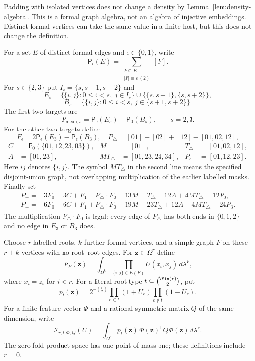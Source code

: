 Padding with isolated vertices does not change a density by Lemma~\ref{lem:density-algebra}.
This is a formal graph algebra, not an algebra of injective embeddings.  Distinct formal
vertices can take the same value in a finite host, but this does not change the definition.

\begin{definition}
\label{def:certificate-targets}
For a set $E$ of distinct formal edges and $\epsilon\in\{0,1\}$, write
\[
 \mathsf P_\epsilon(E)=
 \sum_{\substack{F\subseteq E\\ |F|\equiv\epsilon\ (2)}}[F].
\]
For $s\in\{2,3\}$ put $I_s=\{s,s+1,s+2\}$ and
\[
 E_s=\{\{i,j\}:0\le i<s,\ j\in I_s\}\cup\{\{s,s+1\},\{s,s+2\}\},
\]
\[
 B_s=\{\{i,j\}:0\le i<s,\ j\in\{s+1,s+2\}\}.
\]
The first two targets are
\[
 P_{\mathrm{mean},s}=\mathsf P_0(E_s)-\mathsf P_0(B_s),\qquad s=2,3.
\]
For the other two targets define
\[
 F_\epsilon=2\mathsf P_\epsilon(E_3)-\mathsf P_\epsilon(B_3),
 \quad
 P_\triangle=[01]+[02]+[12]-[01,02,12],
\]
\[
 \begin{aligned}
 C&=\mathsf P_0(\{01,12,23,03\}),& M&=[01],& T_\triangle&=[01,02,12],\\
 A&=[01,23],& M T_\triangle&=[01,23,24,34],& P_3&=[01,12,23].
 \end{aligned}
\]
Here $ij$ denotes $\{i,j\}$.  The symbol $M T_\triangle$ in the second line means the specified
disjoint-union graph, not overlapping multiplication of the earlier labelled masks.
Finally set
\begin{align*}
 P_-={}&3F_0-3C+F_1-P_\triangle\cdot F_0
       -13M-T_\triangle-12A+4MT_\triangle-12P_3,\\
 P_+={}&6F_0-6C+F_1+P_\triangle\cdot F_0
       -19M-23T_\triangle+12A-4MT_\triangle-24P_3.
\end{align*}
The multiplication $P_\triangle\cdot F_0$ is legal: every edge of $P_\triangle$ has both
ends in $\{0,1,2\}$ and no edge in $E_3$ or $B_3$ does.
\end{definition}

\begin{definition}
\label{def:rooted-features}
Choose $r$ labelled roots, $k$ further formal vertices, and a simple graph $F$ on these
$r+k$ vertices with no root--root edges.  For $\mathbf z\in\Omega^r$ define
\[
 \Phi_F(\mathbf z)=\int_{\Omega^k}
                  \prod_{\{i,j\}\in E(F)}U(x_i,x_j)\,d\lambda^k,
\]
where $x_i=z_i$ for $i<r$.  For a literal root type $t\subseteq\binom{\Fin(r)}2$, put
\[
 p_t(\mathbf z)=2^{-\binom r2}
     \prod_{e\in t}(1+U_e)\prod_{e\notin t}(1-U_e).
\]
For a finite feature vector $\Phi$ and a rational symmetric matrix $Q$ of the same dimension,
write
\[
 \mathcal I_{r,t,\Phi,Q}(U)
 =\int_{\Omega^r}p_t(\mathbf z)\,
                  \Phi(\mathbf z)^{\mathsf T}Q\Phi(\mathbf z)\,d\lambda^r.
\]
The zero-fold product space has one point of mass one; these definitions include $r=0$.
\end{definition}

